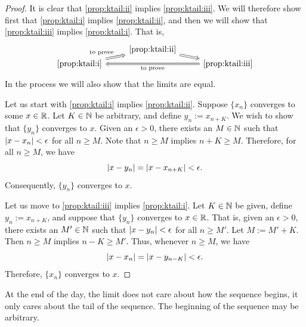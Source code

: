 \begin{proof}
It is clear that
\ref{prop:ktail:ii} implies \ref{prop:ktail:iii}.
We will therefore show first that
\ref{prop:ktail:i}
implies
\ref{prop:ktail:ii},
and then we will show that
\ref{prop:ktail:iii}
implies
\ref{prop:ktail:i}.  That is, 
\begin{equation*}
\begin{tikzcd}[row sep=0pt]
& \text{\ref{prop:ktail:ii}} \ar[dr, Rightarrow] & \\
\text{\ref{prop:ktail:i}} \ar[ur, Rightarrow, "\text{to prove}"] & &
\text{\ref{prop:ktail:iii}} \ar[ll, Rightarrow, "\text{to prove}"] 
\end{tikzcd}
\end{equation*}
In the process we will also show that the limits are equal.

Let us start with \ref{prop:ktail:i} implies \ref{prop:ktail:ii}.
Suppose $\{x_n \}$ converges to some $x \in {\mathbb{R}}$.
Let $K \in {\mathbb{N}}$ be arbitrary, and
define $y_n := x_{n+K}$.  We wish to show that $\{ y_n \}$ converges
to $x$.
Given an $\epsilon > 0$, there exists an $M \in {\mathbb{N}}$ such that
$\left\lvert {x-x_n} \right\rvert < \epsilon$ for all $n \geq M$.
Note that $n \geq M$ implies $n+K \geq M$.  Therefore, for
all $n \geq M$, we have
\begin{equation*}
\left\lvert {x-y_n} \right\rvert = \left\lvert {x-x_{n+K}} \right\rvert < \epsilon .
\end{equation*}
Consequently, $\{ y_n \}$ converges to $x$.

Let us move to \ref{prop:ktail:iii} implies \ref{prop:ktail:i}.
Let $K \in {\mathbb{N}}$ be given, define
$y_n := x_{n+K}$, and suppose that $\{ y_n \}$ converges to $x \in {\mathbb{R}}$.
That is, given an $\epsilon > 0$, there exists an $M' \in {\mathbb{N}}$ such that
$\left\lvert {x-y_n} \right\rvert < \epsilon$ for all $n \geq M'$.
Let $M := M'+K$.  Then $n \geq M$ implies $n-K \geq M'$.
Thus, whenever $n \geq M$, we have
\begin{equation*}
\left\lvert {x-x_n} \right\rvert = \left\lvert {x-y_{n-K}} \right\rvert < \epsilon.
\end{equation*}
Therefore, $\{ x_n \}$ converges to $x$.
\end{proof}

At the end of the day, the limit does not care about how the sequence begins, it only
cares about the tail of the sequence.  The beginning of the sequence
may be arbitrary.

